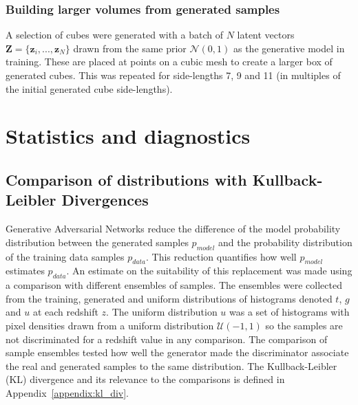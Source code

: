 \documentclass[twocolumn]{article}
\numberwithin{equation}{section}
\begin{document}

\subsubsection{Building larger volumes from generated samples}\label{methods:volume_building}
A selection of cubes were generated with a batch of $N$ latent vectors $\mathbf{Z}=\{\mathbf{z}_i, ..., \mathbf{z}_N\}$ 
drawn from the same prior $\mathcal{N}(0,1)$ as the generative model in training. These are placed at points on a cubic 
mesh to create a larger box of generated cubes. This was repeated for side-lengths 7, 9 and 11 (in multiples of the initial 
generated cube side-lengths). 


\section{Statistics and diagnostics}\label{methods:stats_and_diags}

\subsection{Comparison of distributions with Kullback-Leibler Divergences}
Generative Adversarial Networks reduce the difference of the model probability distribution between the generated samples 
$p_{model}$ and the probability distribution of the training data samples $p_{data}$. This reduction quantifies how well 
$p_{model}$ estimates $p_{data}$. An estimate on the suitability of this replacement was made using a comparison with 
different ensembles of samples. The ensembles were collected from the training, generated and uniform distributions of 
histograms denoted $t$, $g$ and $u$ at each redshift $z$. The uniform distribution $u$ was a set of histograms with pixel 
densities drawn from a uniform distribution $\mathcal{U}(-1,1)$ so the samples are not discriminated for a redshift value 
in any comparison. The comparison of sample ensembles tested how well the generator made the discriminator associate the 
real and generated samples to the same distribution. The Kullback-Leibler (KL) divergence and its relevance to the 
comparisons is defined in Appendix~\ref{appendix:kl_div}.
\end{document}
